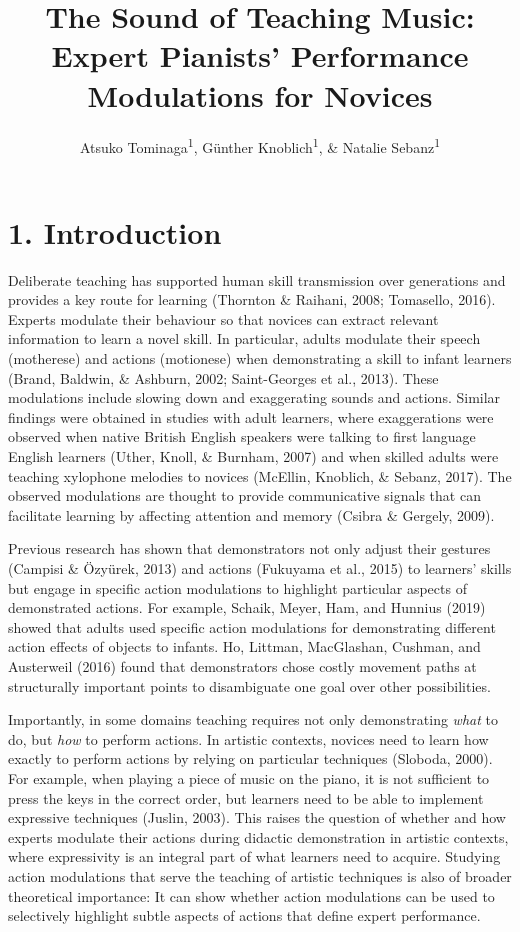\documentclass[
  english,
  man,floatsintext]{apa6}
\title{The Sound of Teaching Music: Expert Pianists' Performance Modulations for Novices}
\author{Atsuko Tominaga\textsuperscript{1}, Günther Knoblich\textsuperscript{1}, \& Natalie Sebanz\textsuperscript{1}}
\date{}
\affiliation{\vspace{0.5cm}\textsuperscript{1} Department of Cognitive Science, Central European University}
\begin{document}
\maketitle

\hypertarget{introduction}{%
\section{1. Introduction}\label{introduction}}

Deliberate teaching has supported human skill transmission over generations and provides a key route for learning (Thornton \& Raihani, 2008; Tomasello, 2016). Experts modulate their behaviour so that novices can extract relevant information to learn a novel skill. In particular, adults modulate their speech (motherese) and actions (motionese) when demonstrating a skill to infant learners (Brand, Baldwin, \& Ashburn, 2002; Saint-Georges et al., 2013). These modulations include slowing down and exaggerating sounds and actions. Similar findings were obtained in studies with adult learners, where exaggerations were observed when native British English speakers were talking to first language English learners (Uther, Knoll, \& Burnham, 2007) and when skilled adults were teaching xylophone melodies to novices (McEllin, Knoblich, \& Sebanz, 2017). The observed modulations are thought to provide communicative signals that can facilitate learning by affecting attention and memory (Csibra \& Gergely, 2009).

Previous research has shown that demonstrators not only adjust their gestures (Campisi \& Özyürek, 2013) and actions (Fukuyama et al., 2015) to learners' skills but engage in specific action modulations to highlight particular aspects of demonstrated actions. For example, Schaik, Meyer, Ham, and Hunnius (2019) showed that adults used specific action modulations for demonstrating different action effects of objects to infants. Ho, Littman, MacGlashan, Cushman, and Austerweil (2016) found that demonstrators chose costly movement paths at structurally important points to disambiguate one goal over other possibilities.

Importantly, in some domains teaching requires not only demonstrating \emph{what} to do, but \emph{how} to perform actions. In artistic contexts, novices need to learn how exactly to perform actions by relying on particular techniques (Sloboda, 2000). For example, when playing a piece of music on the piano, it is not sufficient to press the keys in the correct order, but learners need to be able to implement expressive techniques (Juslin, 2003). This raises the question of whether and how experts modulate their actions during didactic demonstration in artistic contexts, where expressivity is an integral part of what learners need to acquire. Studying action modulations that serve the teaching of artistic techniques is also of broader theoretical importance: It can show whether action modulations can be used to selectively highlight subtle aspects of actions that define expert performance.
\end{document}
